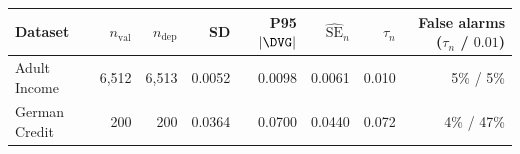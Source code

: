 \begin{tabular}{@{}lrrrrrrr@{}}
\toprule
Dataset & $n_{\text{val}}$ & $n_{\text{dep}}$ & SD & P95 $|\DVG|$ & $\widehat{\mathrm{SE}}_n$ & $\tau_n$ & False alarms ($\tau_n$ / $0.01$) \\
\midrule
Adult Income & 6{,}512 & 6{,}513 & 0.0052 & 0.0098 & 0.0061 & 0.010 & 5\% / 5\% \\
German Credit & 200 & 200 & 0.0364 & 0.0700 & 0.0440 & 0.072 & 4\% / 47\% \\
\bottomrule
\end{tabular}
